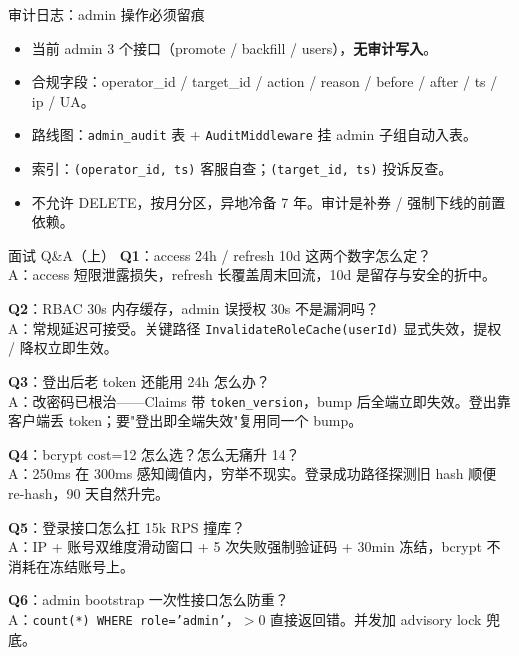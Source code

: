 \documentclass[aspectratio=169,11pt]{beamer}
\begin{document}
\begin{frame}[shrink]{审计日志：admin 操作必须留痕}
\begin{itemize}
  \item 当前 admin 3 个接口（promote / backfill / users），\textbf{无审计写入}。
  \item 合规字段：operator\_id / target\_id / action / reason / before / after / ts / ip / UA。
  \item 路线图：\texttt{admin\_audit} 表 + \texttt{AuditMiddleware} 挂 admin 子组自动入表。
  \item 索引：\texttt{(operator\_id, ts)} 客服自查；\texttt{(target\_id, ts)} 投诉反查。
  \item 不允许 DELETE，按月分区，异地冷备 7 年。审计是补券 / 强制下线的前置依赖。
\end{itemize}
\end{frame}

\appendix

\begin{frame}[shrink]{面试 Q\&A（上）}
\scriptsize
\textbf{Q1}：access 24h / refresh 10d 这两个数字怎么定？\\
\hspace{3mm}A：access 短限泄露损失，refresh 长覆盖周末回流，10d 是留存与安全的折中。

\vspace{1mm}
\textbf{Q2}：RBAC 30s 内存缓存，admin 误授权 30s 不是漏洞吗？\\
\hspace{3mm}A：常规延迟可接受。关键路径 \texttt{InvalidateRoleCache(userId)} 显式失效，提权 / 降权立即生效。

\vspace{1mm}
\textbf{Q3}：登出后老 token 还能用 24h 怎么办？\\
\hspace{3mm}A：改密码已根治——Claims 带 \texttt{token\_version}，bump 后全端立即失效。登出靠客户端丢 token；要"登出即全端失效"复用同一个 bump。

\vspace{1mm}
\textbf{Q4}：bcrypt cost=12 怎么选？怎么无痛升 14？\\
\hspace{3mm}A：250ms 在 300ms 感知阈值内，穷举不现实。登录成功路径探测旧 hash 顺便 re-hash，90 天自然升完。

\vspace{1mm}
\textbf{Q5}：登录接口怎么扛 15k RPS 撞库？\\
\hspace{3mm}A：IP + 账号双维度滑动窗口 + 5 次失败强制验证码 + 30min 冻结，bcrypt 不消耗在冻结账号上。

\vspace{1mm}
\textbf{Q6}：admin bootstrap 一次性接口怎么防重？\\
\hspace{3mm}A：\texttt{count(*) WHERE role='admin'}，$>0$ 直接返回错。并发加 advisory lock 兜底。
\end{frame}
\end{document}
